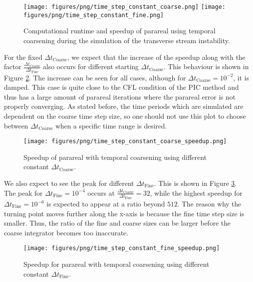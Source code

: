  \begin{figure}[h]
    \centering
    \texttt{[image: figures/png/time\_step\_constant\_coarse.png]}
    \texttt{[image: figures/png/time\_step\_constant\_fine.png]}
    \caption{Computational runtime and speedup of parareal using temporal coarsening during the simulation of the transverse stream instability.}
    \label{fig: temporal-coarsening}
\end{figure}
For the fixed $\Delta t_\mathrm{Coarse}$, we expect that the increase of the speedup along with the factor $\frac{\Delta t_\mathrm{Coarse}}{\Delta t_\mathrm{Fine}}$ also occurs for different starting $\Delta t_\mathrm{Coarse}$. This behaviour is shown in Figure \ref{fig: temporal-coarsening-speedup_coarse_const}. The increase can be seen for all cases, although for $\Delta t_\mathrm{Coarse} = 10^{-2}$, it is damped. This case is quite close to the CFL condition of the PIC method and thus has a large amount of parareal iterations where the parareal error is not properly converging. As stated before, the time periods which are simulated are dependent on the coarse time step size, so one should not use this plot to choose between $\Delta t_\mathrm{Coarse}$ when a specific time range is desired.
 \begin{figure}[h]
    \centering
    \texttt{[image: figures/png/time\_step\_constant\_coarse\_speedup.png]}
    \caption{Speedup of parareal with temporal coarsening using different constant $\Delta t_\mathrm{Coarse}$.}
    \label{fig: temporal-coarsening-speedup_coarse_const}
\end{figure}
We also expect to see the peak for different $\Delta t_\mathrm{Fine}$. This is shown in Figure \ref{fig: temporal-coarsening-speedup_fine_const}. The peak for $\Delta t_\mathrm{Fine} =10^{-4}$ occurs at $\frac{\Delta t_\mathrm{Coarse}}{\Delta t_\mathrm{Fine}} = 32$, while the highest speedup for $\Delta t_\mathrm{Fine} = 10^{-6}$ is expected to appear at a ratio beyond $512$. The reason why the turning point moves further along the x-axis is because the fine time step size is smaller. Thus, the ratio of the fine and coarse sizes can be larger before the coarse integrator becomes too inaccurate.
 \begin{figure}[h]
    \centering
    \texttt{[image: figures/png/time\_step\_constant\_fine\_speedup.png]}
    \caption{Speedup for parareal with temporal coarsening using different constant $\Delta t_\mathrm{Fine}$.}
    \label{fig: temporal-coarsening-speedup_fine_const}
\end{figure}


